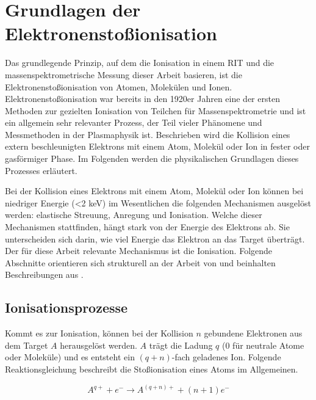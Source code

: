 \chapter{Grundlagen der Elektronenstoßionisation}
\label{chap:ion}
Das grundlegende Prinzip, auf dem die Ionisation in einem RIT und die massenspektrometrische Messung dieser Arbeit basieren, ist die Elektronenstoßionisation von Atomen, Molekülen und Ionen. 
Elektronenstoßionisation war bereits in den 1920er Jahren eine der ersten Methoden zur gezielten Ionisation von Teilchen für Massenspektrometrie und ist ein allgemein sehr relevanter Prozess, der Teil vieler Phänomene und Messmethoden in der Plasmaphysik ist. Beschrieben wird die Kollision eines extern beschleunigten Elektrons mit einem Atom, Molekül oder Ion in fester oder gasförmiger Phase. Im Folgenden werden die physikalischen Grundlagen dieses Prozesses erläutert. 

Bei der Kollision eines Elektrons mit einem Atom, Molekül oder Ion können bei niedriger Energie (<2 keV) im Wesentlichen die folgenden Mechanismen ausgelöst werden: elastische Streuung, Anregung und Ionisation. Welche dieser Mechanismen stattfinden, hängt stark von der Energie des Elektrons ab. Sie unterscheiden sich darin, wie viel Energie das Elektron an das Target überträgt. Der für diese Arbeit relevante Mechanismus ist die Ionisation. Folgende Abschnitte orientieren sich strukturell an der Arbeit von \cite{Ebinger} und beinhalten Beschreibungen aus \cite{EII}.

\section{Ionisationsprozesse}
Kommt es zur Ionisation, können bei der Kollision $n$ gebundene Elektronen aus dem Target $A$ herausgelöst werden. $A$ trägt die Ladung $q$ (0 für neutrale Atome oder Moleküle) und es entsteht ein $(q+n)$-fach geladenes Ion. Folgende Reaktionsgleichung beschreibt die Stoßionisation eines Atoms im Allgemeinen.

\begin{equation}
     A^{q+} + e^- \rightarrow A^{(q+n)+} + (n + 1) e^-
\end{equation}

